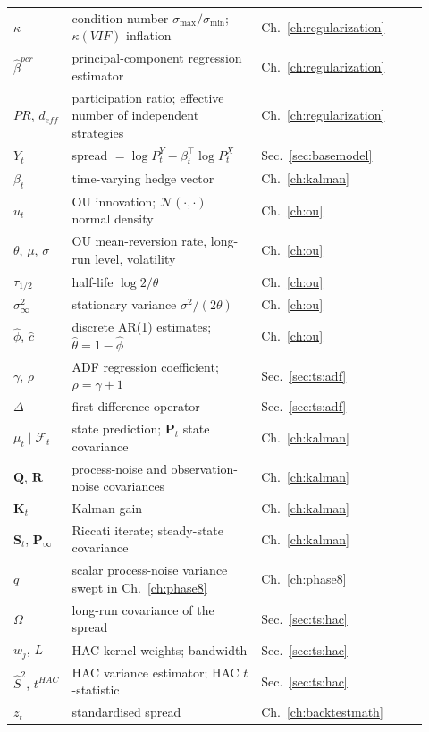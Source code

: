 \begin{center}
\begin{tabular}{p{0.13\linewidth}p{0.42\linewidth}p{0.37\linewidth}}
$\kappa$ & condition number $\sigma_{\max}/\sigma_{\min}$; $\kappa(VIF)$ inflation & Ch.~\ref{ch:regularization} \\
$\hat\beta^{pcr}$ & principal-component regression estimator & Ch.~\ref{ch:regularization} \\
$PR$, $d_{eff}$ & participation ratio; effective number of independent strategies & Ch.~\ref{ch:regularization} \\
$Y_t$ & spread $=\log P_t^Y-\beta_t^\top\log P_t^X$ & Sec.~\ref{sec:basemodel} \\
$\beta_t$ & time-varying hedge vector & Ch.~\ref{ch:kalman} \\
$u_t$ & OU innovation; $\mathcal{N}(\cdot,\cdot)$ normal density & Ch.~\ref{ch:ou} \\
$\theta$, $\mu$, $\sigma$ & OU mean-reversion rate, long-run level, volatility & Ch.~\ref{ch:ou} \\
$\tau_{1/2}$ & half-life $\log 2/\theta$ & Ch.~\ref{ch:ou} \\
$\sigma_\infty^2$ & stationary variance $\sigma^2/(2\theta)$ & Ch.~\ref{ch:ou} \\
$\hat\phi$, $\hat c$ & discrete AR(1) estimates; $\hat\theta=1-\hat\phi$ & Ch.~\ref{ch:ou} \\
$\gamma$, $\rho$ & ADF regression coefficient; $\rho=\gamma+1$ & Sec.~\ref{sec:ts:adf} \\
$\Delta$ & first-difference operator & Sec.~\ref{sec:ts:adf} \\
$\mu_t\mid\mathcal{F}_t$ & state prediction; $\mathbf{P}_t$ state covariance & Ch.~\ref{ch:kalman} \\
$\mathbf{Q}$, $\mathbf{R}$ & process-noise and observation-noise covariances & Ch.~\ref{ch:kalman} \\
$\mathbf{K}_t$ & Kalman gain & Ch.~\ref{ch:kalman} \\
$\mathbf{S}_t$, $\mathbf{P}_\infty$ & Riccati iterate; steady-state covariance & Ch.~\ref{ch:kalman} \\
$q$ & scalar process-noise variance swept in Ch.~\ref{ch:phase8} & Ch.~\ref{ch:phase8} \\
$\Omega$ & long-run covariance of the spread & Sec.~\ref{sec:ts:hac} \\
$w_j$, $L$ & HAC kernel weights; bandwidth & Sec.~\ref{sec:ts:hac} \\
$\hat S^2$, $t^{HAC}$ & HAC variance estimator; HAC $t$-statistic & Sec.~\ref{sec:ts:hac} \\
$z_t$ & standardised spread & Ch.~\ref{ch:backtestmath} \\

\end{tabular}
\end{center}
